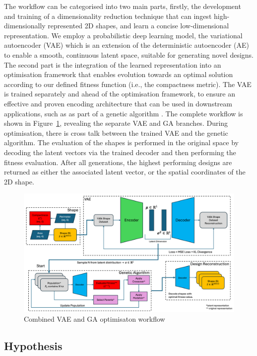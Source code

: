 \documentclass{article}
\begin{document}
The workflow can be categorised into two main parts, firstly, the development and training of a dimensionality reduction technique that can ingest high-dimensionally represented 2D shapes, and learn a concise low-dimensional representation. We employ a probabilistic deep learning model, the variational autoencoder (VAE) which is an extension of the deterministic autoencoder (AE) to enable a smooth, continuous latent space, suitable for generating novel designs. The second part is the integration of the learned representation into an optimisation framework that enables evolution towards an optimal solution according to our defined fitness function (i.e., the compactness metric). The VAE is trained separately and ahead of the optimisation framework, to ensure an effective and proven encoding architecture that can be used in downstream applications, such as as part of a genetic algorithm \citep{Deshpande2024}. The complete workflow is shown in Figure~\ref{VAE_GA_workflow}, revealing the separate VAE and GA branches. During optimisation, there is cross talk between the trained VAE and the genetic algorithm. The evaluation of the shapes is performed in the original space by decoding the latent vectors via the trained decoder and then performing the fitness evaluation. After all generations, the highest performing designs are returned as either the associated latent vector, or the spatial coordinates of the 2D shape.


\begin{figure}[htp]
    \centering
    \includegraphics[width=12cm]{figures/workflow_diagram.png}
    \caption{Combined VAE and GA optimisaton workflow}

    \label{VAE_GA_workflow}
\end{figure}

\subsection{Hypothesis}
\end{document}

